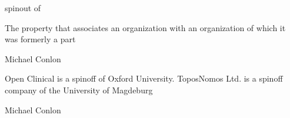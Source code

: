 \documentclass[letterpaper,10pt,english]{sphinxmanual}
\begin{document}
\begin{sphinxShadowBox}

\sphinxAtStartPar
spinout of
\end{sphinxShadowBox}

\begin{sphinxShadowBox}

\sphinxAtStartPar
{}
\end{sphinxShadowBox}

\begin{sphinxShadowBox}

\sphinxAtStartPar
The property that associates an organization with an organization of which it was formerly a part
\end{sphinxShadowBox}

\begin{sphinxShadowBox}

\sphinxAtStartPar
Michael Conlon 
\end{sphinxShadowBox}

\begin{sphinxShadowBox}

\sphinxAtStartPar
{\hyperref[\detokenize{doc-ORG_0000001::doc}]{}}
\end{sphinxShadowBox}

\begin{sphinxShadowBox}

\sphinxAtStartPar
{\hyperref[\detokenize{doc-ORG_0000001::doc}]{}}
\end{sphinxShadowBox}

\begin{sphinxShadowBox}

\sphinxAtStartPar
Open Clinical is a spin\sphinxhyphen{}off of Oxford University. ToposNomos Ltd. is a spin\sphinxhyphen{}off company of the University of Magdeburg
\end{sphinxShadowBox}

\begin{sphinxShadowBox}

\sphinxAtStartPar
Michael Conlon 
\end{sphinxShadowBox}
\begin{quote}

\ignorespaces \end{quote}
\end{document}
